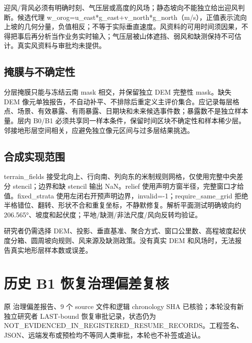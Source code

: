 \documentclass[UTF8,a4paper,10pt,fontset=fandol]{ctexart}
\begin{document}
迎风/背风必须有明确时刻、气压层或高度的风场；静态坡向不能独立给出迎风判断。候选代理 w\_\allowbreak{}orog=u\_\allowbreak{}east*g\_\allowbreak{}east+v\_\allowbreak{}north*g\_\allowbreak{}north（m/s），正值表示流向上坡的几何分量，负值相反；不等于实际垂直速度。风资料的可用时间须因果，不得把事后再分析当作业务实时输入；气压层被山体遮挡、弱风和缺测保持不可估计。真实风资料与审批均未提供。\par

\subsection*{掩膜与不确定性}

分层掩膜只能与冻结云南 mask 相交，并保留独立 DEM 完整性 mask。缺失 DEM 像元单独报告，不自动补平、不排除后重定义主评价集合。应记录每层格点、场景、有效暴露、有雨暴露、日期块和未来候选事件数；暴露数不是独立样本量。层内 B0/B1 必须共享同一样本条件，保留时间区块不确定性和样本稀少层。邻接地形层空间相关，应避免独立像元区间与过多层结果挑选。\par

\subsection*{合成实现范围}

terrain\_\allowbreak{}fields 接受北向上、行向南、列向东的米制规则网格，仅使用完整中央差分 stencil；边界和缺 stencil 输出 NaN。relief 使用声明方窗半径，完整窗口才给值。fixed\_\allowbreak{}strata 使用左闭右开预声明边界，invalid=-1；require\_\allowbreak{}same\_\allowbreak{}grid 拒绝半格错位、翻转、形状不合和重复坐标，不静默修复。解析平面测试明确坡向约 206.565°、坡度和起伏度；平地/缺测/非法尺度/风向反转均验证。\par

研究者仍需选择 DEM、投影、垂直基准、聚合方式、窗口公里数、高程坡度起伏度分箱、圆周坡向规则、风来源及缺测政策。没有真实 DEM 和风场时，无法报告真实地形层样本数或误差。\par

\clearpage
\section*{历史 B1 恢复治理偏差复核}

原 治理偏差报告、9 个 source 文件和逻辑 chronology SHA 已核验；本轮没有新独立研究者 LAST-bound 恢复审批记录，状态仍为 NOT\_\allowbreak{}EVIDENCED\_\allowbreak{}IN\_\allowbreak{}REGISTERED\_\allowbreak{}RESUME\_\allowbreak{}RECORDS。工程签名、JSON、远端发布或预检均不等同人类审批，本轮也不补签或追认。\par
\end{document}
